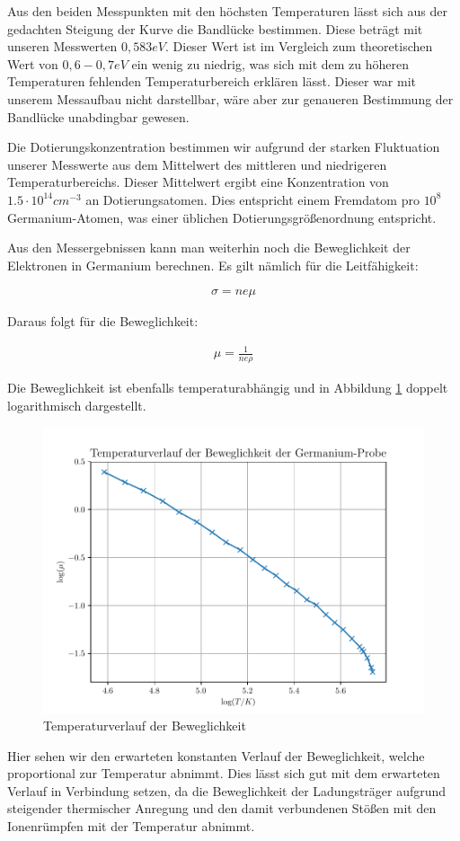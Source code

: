 Aus den beiden Messpunkten mit den höchsten Temperaturen lässt sich aus der gedachten Steigung der Kurve die Bandlücke bestimmen. Diese beträgt mit unseren Messwerten $0,583eV$. Dieser Wert ist im Vergleich zum theoretischen Wert von $0,6-0,7eV$ ein wenig zu niedrig, was sich mit dem zu höheren Temperaturen fehlenden Temperaturbereich erklären lässt. Dieser war mit unserem Messaufbau nicht darstellbar, wäre aber zur genaueren Bestimmung der Bandlücke unabdingbar gewesen. 

Die Dotierungskonzentration bestimmen wir aufgrund der starken Fluktuation unserer Messwerte aus dem Mittelwert des mittleren und niedrigeren Temperaturbereichs. Dieser Mittelwert ergibt eine Konzentration von $1.5 \cdot 10^{14} cm^{-3}$ an Dotierungsatomen. Dies entspricht einem Fremdatom pro $10^8$ Germanium-Atomen, was einer üblichen Dotierungsgrößenordnung entspricht. 

Aus den Messergebnissen kann man weiterhin noch die Beweglichkeit der Elektronen in Germanium berechnen. Es gilt nämlich für die Leitfähigkeit:

\begin{align}
\sigma=ne\mu
\end{align}

Daraus folgt für die Beweglichkeit:

\begin{align}
\mu=\frac{1}{ne\rho}
\end{align}

Die Beweglichkeit ist ebenfalls temperaturabhängig und in Abbildung \ref{mu} doppelt logarithmisch dargestellt.

\begin{figure}[htbp] 
     \includegraphics[scale=0.7]{temp_mu.pdf}
  \caption{Temperaturverlauf der Beweglichkeit}
  \label{mu}
\end{figure}

Hier sehen wir den erwarteten konstanten Verlauf der Beweglichkeit, welche proportional zur Temperatur abnimmt. Dies lässt sich gut mit dem erwarteten Verlauf in Verbindung setzen, da die Beweglichkeit der Ladungsträger aufgrund steigender thermischer Anregung und den damit verbundenen Stößen mit den Ionenrümpfen mit der Temperatur abnimmt. 